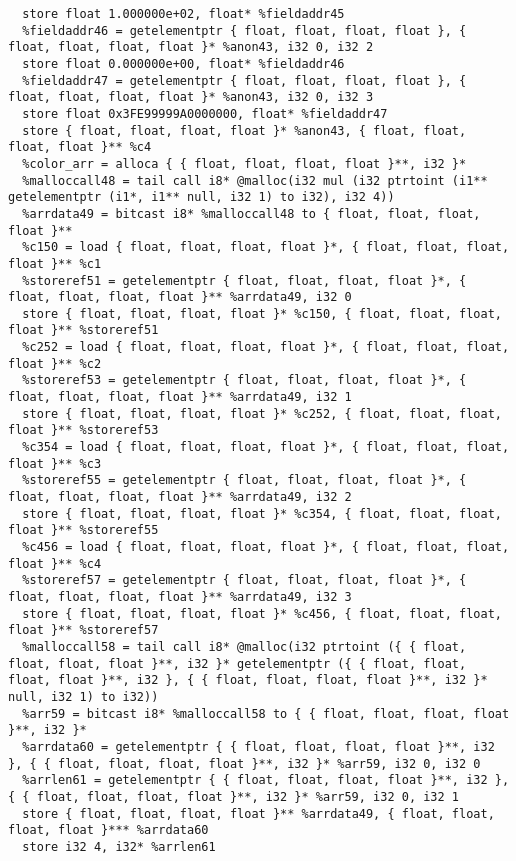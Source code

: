 \documentclass[main.tex]{subfiles}
\begin{document}
{\begin{lstlisting}
  store float 1.000000e+02, float* %fieldaddr45
  %fieldaddr46 = getelementptr { float, float, float, float }, { float, float, float, float }* %anon43, i32 0, i32 2
  store float 0.000000e+00, float* %fieldaddr46
  %fieldaddr47 = getelementptr { float, float, float, float }, { float, float, float, float }* %anon43, i32 0, i32 3
  store float 0x3FE99999A0000000, float* %fieldaddr47
  store { float, float, float, float }* %anon43, { float, float, float, float }** %c4
  %color_arr = alloca { { float, float, float, float }**, i32 }*
  %malloccall48 = tail call i8* @malloc(i32 mul (i32 ptrtoint (i1** getelementptr (i1*, i1** null, i32 1) to i32), i32 4))
  %arrdata49 = bitcast i8* %malloccall48 to { float, float, float, float }**
  %c150 = load { float, float, float, float }*, { float, float, float, float }** %c1
  %storeref51 = getelementptr { float, float, float, float }*, { float, float, float, float }** %arrdata49, i32 0
  store { float, float, float, float }* %c150, { float, float, float, float }** %storeref51
  %c252 = load { float, float, float, float }*, { float, float, float, float }** %c2
  %storeref53 = getelementptr { float, float, float, float }*, { float, float, float, float }** %arrdata49, i32 1
  store { float, float, float, float }* %c252, { float, float, float, float }** %storeref53
  %c354 = load { float, float, float, float }*, { float, float, float, float }** %c3
  %storeref55 = getelementptr { float, float, float, float }*, { float, float, float, float }** %arrdata49, i32 2
  store { float, float, float, float }* %c354, { float, float, float, float }** %storeref55
  %c456 = load { float, float, float, float }*, { float, float, float, float }** %c4
  %storeref57 = getelementptr { float, float, float, float }*, { float, float, float, float }** %arrdata49, i32 3
  store { float, float, float, float }* %c456, { float, float, float, float }** %storeref57
  %malloccall58 = tail call i8* @malloc(i32 ptrtoint ({ { float, float, float, float }**, i32 }* getelementptr ({ { float, float, float, float }**, i32 }, { { float, float, float, float }**, i32 }* null, i32 1) to i32))
  %arr59 = bitcast i8* %malloccall58 to { { float, float, float, float }**, i32 }*
  %arrdata60 = getelementptr { { float, float, float, float }**, i32 }, { { float, float, float, float }**, i32 }* %arr59, i32 0, i32 0
  %arrlen61 = getelementptr { { float, float, float, float }**, i32 }, { { float, float, float, float }**, i32 }* %arr59, i32 0, i32 1
  store { float, float, float, float }** %arrdata49, { float, float, float, float }*** %arrdata60
  store i32 4, i32* %arrlen61

\end{lstlisting}}
\end{document}
